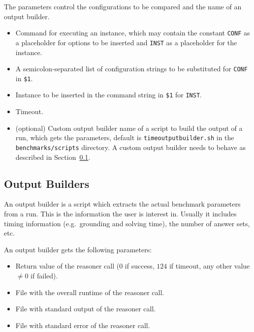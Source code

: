 \documentclass[a4paper]{article}
\begin{document}
		    The parameters control the configurations to be compared
		    and the name of an output builder.
		
		    \medskip{}
		    \begin{itemize}
				\item[{\tt \$1}:] Command for executing an instance, which may contain the constant {\tt CONF} as a placeholder
					for options to be inserted and {\tt INST} as a placeholder for the instance.
				\item[{\tt \$2}:] A semicolon-separated list of configuration strings to be substituted for {\tt CONF} in {\tt \$1}.
				\item[{\tt \$3}:] Instance to be inserted in the command string in {\tt \$1} for {\tt INST}.
				\item[{\tt \$4}:] Timeout.
				\item[{\tt \$5}:] (optional) Custom output builder name of a script to build the output of a run, which gets the parameters, default is {\tt timeoutputbuilder.sh}
					in the {\tt benchmarks/scripts} directory. A custom output builder needs to behave as described in Section~\ref{sec:architecture:outputbuilder}.
		    \end{itemize}
	
		\subsection{Output Builders}
		\label{sec:architecture:outputbuilder}
				
			An output builder is a script which extracts the actual benchmark parameters
			from a run. This is the information the user is interest in. Usually it
			includes timing information (e.g.~grounding and solving time), the number of answer sets, etc.
			
			An output builder gets the following parameters:
			    \begin{itemize}
					\item[{\tt \$1}:] Return value of the reasoner call ($0$ if success, $124$ if timeout, any other value $\not= 0$ if failed).
					\item[{\tt \$2}:] File with the overall runtime of the reasoner call.
					\item[{\tt \$3}:] File with standard output of the reasoner call.
					\item[{\tt \$4}:] File with standard error of the reasoner call.
			    \end{itemize}
			
\end{document}
